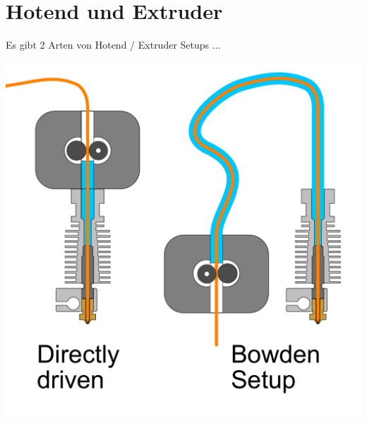 \clearpage %

\newpage %

\section{Hotend und Extruder}
\begin{center}
  Es gibt 2 Arten von Hotend / Extruder Setups ...
\end{center}


\begin{center}
  \includegraphics[scale=0.6]{./bilder/Extruder.pdf}
\end{center}

\newpage %

